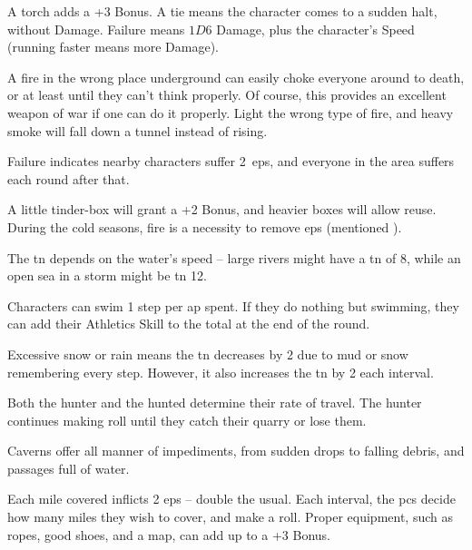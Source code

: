 \begin{multicols}{2}
%
A torch adds a +3 Bonus.
A tie means the character comes to a sudden halt, without Damage.
Failure means $1D6$ Damage, plus the character's Speed (running faster means more Damage).

A fire in the wrong place underground can easily choke everyone around to death, or at least until they can't think properly.
Of course, this provides an excellent weapon of war if one can do it properly.
Light the wrong type of fire, and heavy smoke will fall down a tunnel instead of rising.

Failure indicates nearby characters suffer 2~\glspl{ep}, and everyone in the area suffers  each round after that.

A little tinder-box will grant a +2 Bonus, and heavier boxes will allow reuse.
During the cold seasons, fire is a necessity to remove \glspl{ep} (mentioned ).


The \gls{tn} depends on the water's speed -- large rivers might have a \gls{tn} of 8, while an open sea in a storm might be \gls{tn} 12.

Characters can swim 1 \gls{step} per \gls{ap} spent.
If they do nothing but swimming, they can add their Athletics Skill to the total at the end of the round.

Excessive snow or rain means the \gls{tn} decreases by 2 due to mud or snow remembering every step.
However, it also increases the \gls{tn} by 2 each \gls{interval}.

Both the hunter and the hunted determine their rate of travel.
The hunter continues making roll until they catch their quarry or lose them.

Caverns offer all manner of impediments, from sudden drops to falling debris, and passages full of water.

\caveTravelChart
Each mile covered inflicts 2 \glspl{ep} -- double the usual.
Each \gls{interval}, the \glspl{pc} decide how many miles they wish to cover, and make a roll.
Proper equipment, such as ropes, good shoes, and a map, can add up to a +3 Bonus.


\end{multicols}
